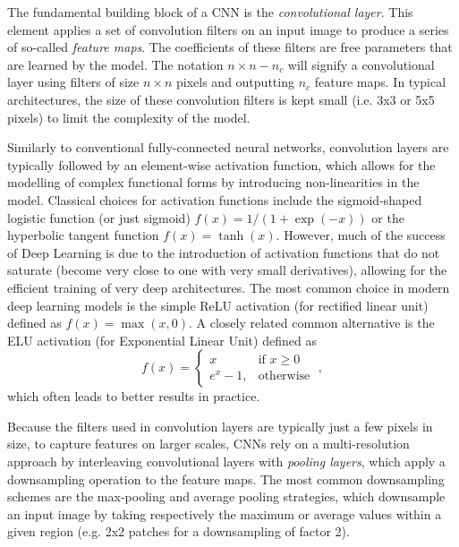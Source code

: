 \documentclass{aa}
\begin{document}
The fundamental building block of a CNN is the \textit{convolutional layer}. This element applies a set of convolution filters on an input image to produce a series of so-called \textit{feature maps}. The coefficients of these filters are free parameters that are learned by the model. The notation 
$n \times n - n_c$ will signify a convolutional layer using filters of size $n \times n$ pixels and outputting $n_c$ feature maps.  In typical architectures, the size of these convolution filters is kept small (i.e. 3x3 or 5x5 pixels) to limit the complexity of the model. 

Similarly to conventional fully-connected neural networks, convolution layers are typically followed  by an element-wise activation function, which allows for the modelling of complex functional forms  by introducing non-linearities in the model.  Classical choices  for  activation functions  include the sigmoid-shaped logistic  function (or just sigmoid) $f(x) = 1/ (1  + \exp(-x))$ or the hyperbolic tangent function $f(x) = \tanh(x)$. However, much of the success of Deep Learning is due to the  introduction of activation functions that do not saturate (become very close to one with very small derivatives), allowing for the  efficient training  of very deep architectures. The most common choice in modern deep learning models  is the simple ReLU activation (for rectified linear unit) \citep{Nair2010} defined as $f(x) = \max(x, 0 )$. A closely related  common alternative is the ELU activation (for Exponential Linear Unit) \citep{2015arXiv151107289C} defined as 
\begin{equation}
	f(x ) = \begin{cases}
    x & \text{if } x\geq 0\\
    e^{x } - 1,              & \text{otherwise}
\end{cases}\;,
\end{equation}
which often leads to better results in practice.

Because the filters used in convolution layers are  typically  just a few pixels in size, to capture features on larger scales, CNNs rely on a multi-resolution approach by interleaving convolutional layers with \textit{pooling layers}, which apply a downsampling operation to the feature maps. The most common downsampling schemes are the max-pooling and average pooling strategies, which downsample an input image by taking respectively the maximum or average values within a given region (e.g. 2x2 patches for a downsampling of factor 2).
\end{document}
